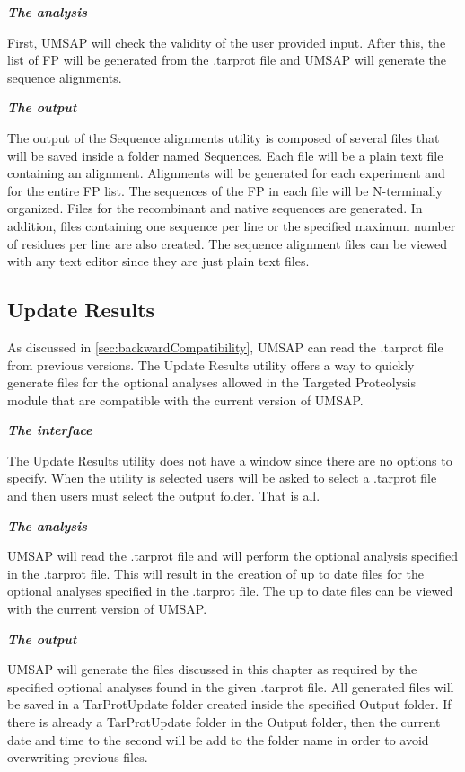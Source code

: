 \textit{\textbf{The analysis}}

First, UMSAP will check the validity of the user provided input. After this, the list of FP will be generated from the .tarprot file and UMSAP will generate the sequence alignments.

\textit{\textbf{The output}}

The output of the Sequence alignments utility is composed of several files that will be saved inside a folder named Sequences. Each file will be a plain text file containing an alignment. Alignments will be generated for each experiment and for the entire FP list. The sequences of the FP in each file will be N-terminally organized. Files for the recombinant and native sequences are generated. In addition, files containing one sequence per line or the specified maximum number of residues per line are also created. The sequence alignment files can be viewed with any text editor since they are just plain text files.

\subsection{Update Results}
\label{subsec:utilUpdateRes}

As discussed in \autoref{sec:backwardCompatibility}, UMSAP can read the .tarprot file from previous versions. The Update Results utility offers a way to quickly generate files for the optional analyses allowed in the Targeted Proteolysis module that are compatible with the current version of UMSAP.

\textit{\textbf{The interface}}

The Update Results utility does not have a window since there are no options to specify. When the utility is selected users will be asked to select a .tarprot file and then users must select the output folder. That is all.

\textit{\textbf{The analysis}}

UMSAP will read the .tarprot file and will perform the optional analysis specified in the .tarprot file. This will result in the creation of up to date files for the optional analyses specified in the .tarprot file. The up to date files can be viewed with the current version of UMSAP.

\textit{\textbf{The output}}

UMSAP will generate the files discussed in this chapter as required by the specified optional analyses found in the given .tarprot file. All generated files will be saved in a TarProtUpdate folder created inside the specified Output folder. If there is already a TarProtUpdate folder in the Output folder, then the current date and time to the second will be add to the folder name in order to avoid overwriting previous files. 


